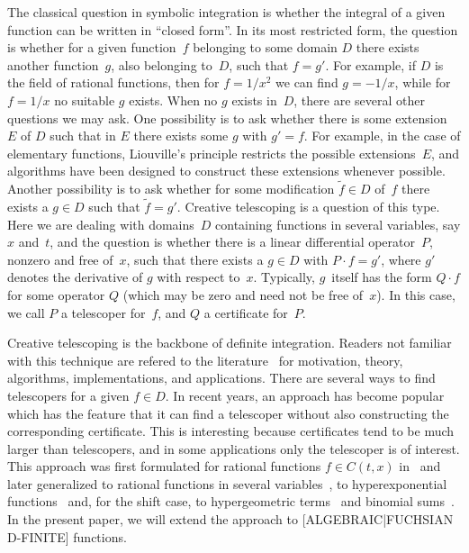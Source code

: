 \documentclass{sig-alternate}
\begin{document}
The classical question in symbolic integration is whether the integral of
a given function can be written in ``closed form''. In its most restricted form,
the question is whether for a given function~$f$ belonging to some domain $D$
there exists another function~$g$, also belonging to~$D$, such that $f=g'$. For
example, if $D$ is the field of rational functions, then for $f=1/x^2$ we can
find $g=-1/x$, while for $f=1/x$ no suitable $g$ exists. When no $g$ exists
in~$D$, there are several other questions we may ask. One possibility is to ask
whether there is some extension~$E$ of $D$ such that in $E$ there exists some
$g$ with $g'=f$. For example, in the case of elementary functions, Liouville's
principle restricts the possible extensions~$E$, and algorithms have been
designed to construct these extensions whenever possible. Another possibility is
to ask whether for some modification $\tilde f\in D$ of~$f$ there exists a $g\in
D$ such that $\tilde f=g'$. Creative telescoping is a question of this
type. Here we are dealing with domains~$D$ containing functions in several
variables, say $x$ and~$t$, and the question is whether there is a linear
differential operator~$P$, nonzero and free of~$x$, such that there exists a
$g\in D$ with $P\cdot f=g'$, where $g'$ denotes the derivative of $g$ with
respect to~$x$. Typically, $g$~itself has the form $Q\cdot f$ for some operator
$Q$ (which may be zero and need not be free of~$x$). In this case, we call $P$
a telescoper for~$f$, and $Q$ a certificate for~$P$.

Creative telescoping is the backbone of definite integration. Readers not
familiar with this technique are refered to the literature~\cite{PWZbook1996,Zeilberger1990c,Zeilberger1991,Zeilberger1990,Koepf1998}
for motivation, theory, algorithms, implementations, and applications. There are
several ways to find telescopers for a given $f\in D$. In recent years, an
approach has become popular which has the feature that it can find a telescoper
without also constructing the corresponding certificate. This is interesting
because certificates tend to be much larger than telescopers, and in some
applications only the telescoper is of interest. This approach was first
formulated for rational functions $f\in C(t,x)$ in~\cite{BCCL2010} and later
generalized to rational functions in several variables~\cite{..}, to
hyperexponential functions~\cite{..} and, for the shift case, to hypergeometric
terms~\cite{..} and binomial sums~\cite{..}. In the present paper, we will extend
the approach to [ALGEBRAIC|FUCHSIAN D-FINITE] functions.
\end{document}
